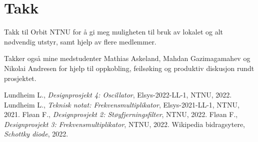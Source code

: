 \documentclass[a4paper,11pt,norsk]{article}
\begin{document}
\section{Takk}

Takk til Orbit NTNU for å gi meg muligheten til bruk av lokalet og alt nødvendig utstyr, samt hjelp av flere medlemmer. 

Takker også mine medstudenter Mathias Askeland, Mahdan Gazimagamahev og Nikolai Andresen for hjelp til oppkobling, feilsøking og produktiv diskusjon rundt prosjektet.

{}

\begin{thebibliography}{99}
        Lundheim L., 
        \textit{Designprosjekt 4: Oscillator}, 
    	Elsys-2022-LL-1, 
    	NTNU,
    	2022.
        Lundheim L., 
        \textit{Teknisk notat: Frekvensmultiplikator}, 
    	Elsys-2021-LL-1, 
    	NTNU,
    	2021.
        Fløan F., 
        \textit{Designprosjekt 2: Støyfjerningsfilter}, 
    	NTNU,
    	2022.
        Fløan F., 
        \textit{Designprosjekt 3: Frekvensmultiplikator}, 
    	NTNU,
    	2022.
        Wikipedia bidragsytere, 
        \textit{Schottky diode}, 
    	2022.
\end{thebibliography}
\end{document}
